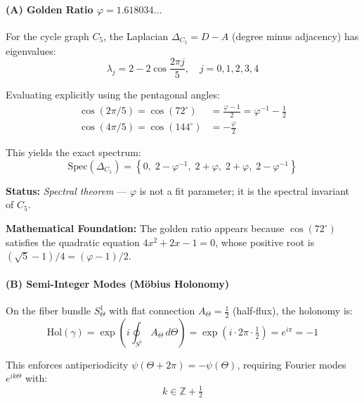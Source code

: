 \documentclass[12pt]{article}
\theoremstyle{definition}
\theoremstyle{plain}
\begin{document}
\paragraph{(A) Golden Ratio $\varphi = 1.618034\ldots$}

For the cycle graph $C_5$, the Laplacian $\Delta_{C_5} = D - A$ (degree minus adjacency) has eigenvalues:
\begin{equation}
\lambda_j = 2 - 2\cos\!\frac{2\pi j}{5}, \quad j = 0, 1, 2, 3, 4
\end{equation}

Evaluating explicitly using the pentagonal angles:
\begin{align}
\cos(2\pi/5) = \cos(72^\circ) &= \frac{\varphi - 1}{2} = \varphi^{-1} - \frac{1}{2} \\
\cos(4\pi/5) = \cos(144^\circ) &= -\frac{\varphi}{2}
\end{align}

This yields the exact spectrum:
\begin{equation}
\boxed{\text{Spec}(\Delta_{C_5}) = \left\{0,\; 2 - \varphi^{-1},\; 2 + \varphi,\; 2 + \varphi,\; 2 - \varphi^{-1}\right\}}
\end{equation}

\textbf{Status:} \textit{Spectral theorem} — $\varphi$ is not a fit parameter; it is the spectral invariant of $C_5$.

\textbf{Mathematical Foundation:} The golden ratio appears because $\cos(72^\circ)$ satisfies the quadratic equation $4x^2 + 2x - 1 = 0$, whose positive root is $(\sqrt{5} - 1)/4 = (\varphi - 1)/2$.

\paragraph{(B) Semi-Integer Modes (M\"obius Holonomy)}

On the fiber bundle $S^1_\Theta$ with flat connection $A_\Theta = \tfrac{1}{2}$ (half-flux), the holonomy is:
\begin{equation}
\text{Hol}(\gamma) = \exp\!\left(i \oint_{S^1} A_\Theta \, d\Theta\right) = \exp(i \cdot 2\pi \cdot \tfrac{1}{2}) = e^{i\pi} = -1
\end{equation}

This enforces antiperiodicity $\psi(\Theta + 2\pi) = -\psi(\Theta)$, requiring Fourier modes $e^{ik\Theta}$ with:
\begin{equation}
\boxed{k \in \mathbb{Z} + \tfrac{1}{2}}
\end{equation}
\end{document}
